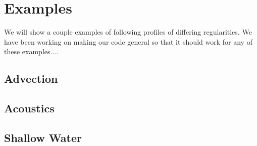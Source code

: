\documentclass[10]{amsart}
\begin{document}
\section{Examples}

We will show a couple examples of following profiles of differing regularities. We have been working on
making our code general so that it should work for any of these examples....

\subsection{Advection}



\subsection{Acoustics}



\subsection{Shallow Water}
\end{document}
